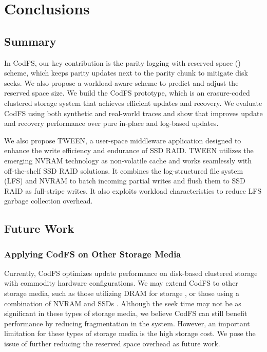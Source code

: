\chapter{Conclusions}
\label{chap:conclusions}

\section{Summary}

In CodFS, our key contribution is the parity logging with reserved space (\PLR) scheme,
which keeps parity updates next to the parity chunk to mitigate disk seeks. We
also propose a workload-aware scheme to predict and adjust the reserved space
size.  We build the CodFS prototype, which is an erasure-coded clustered storage system
that achieves efficient updates and recovery.  We evaluate CodFS 
using both synthetic and real-world traces and show that \PLR improves update
and recovery performance over pure in-place and log-based updates.  

We also propose TWEEN, a user-space middleware application designed to enhance
the write efficiency and endurance of SSD RAID. TWEEN utilizes the emerging
NVRAM technology as non-volatile cache and works seamlessly with off-the-shelf
SSD RAID solutions. It combines the log-structured file system (LFS) and NVRAM
to batch incoming partial writes and flush them to SSD RAID as full-stripe
writes. It also exploits workload characteristics to reduce LFS garbage
collection overhead. 

\section{Future Work}

\subsection{Applying CodFS on Other Storage Media}

Currently, CodFS optimizes update performance on disk-based clustered storage
with commodity hardware configurations. We may extend CodFS to other storage
media, such as those utilizing DRAM for storage \cite{ongaro11}, or those using
a combination of NVRAM and SSDs \cite{qiu13}. Although the seek time may not be
as significant in these types of storage media, we believe CodFS can still
benefit performance by reducing fragmentation in the system. However, an
important limitation for these types of storage media is the high storage cost.
We pose the issue of further reducing the reserved space overhead as future
work.

